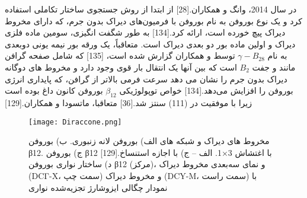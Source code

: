 در سال 2014، وانگ و همکاران.\cite{zhouSemimetallicTwoDimensionalBoron2014}[28] از ابتدا از روش جستجوی ساختار تکاملی استفاده کرد و یک نوع بوروفن به نام  بوروفن با فرمیون‌های دیراک بدون جرم، که دارای مخروط دیراک پیچ خورده است، ارائه کرد.[134] به طور شگفت انگیزی،  سومین ماده فلزی دیراک و اولین ماده بور دو بعدی دیراک است. متعاقباً، یک ورقه بور نیمه یونی دوبعدی به نام $\gamma-B_28$ توسط  و همکاران گزارش شده است، \cite{maGraphenelikeTwoDimensionalIonic2016}[135] که شامل صفحه گرافن مانند و جفت $B_2$ است که بین آنها یک انتقال بار قوی وجود دارد و مخروط های دوگانه دیراک بدون جرم را نشان می دهد سرعت فرمی بالاتر از گرافن، که پایداری انرژی بوروفن  را افزایش می‌دهد.[134] خواص توپولوژیکی $\beta_{12}$ بوروفن کانون داغ بوده است زیرا با موفقیت در  (111) سنتز شد.\cite{mannixSynthesisBorophenesAnisotropic2015}[36] متعاقبا، ماتسودا و همکاران.\cite{fengDiracFermionsBorophene2017}[129] 
\begin{figure*}
    \centering
    \texttt{[image: Diraccone.png]}
    \caption{مخروط های دیراک و شبکه های الف) بوروفن لانه زنبوری. ب) بوروفن β12. ج) بوروفن β12 با اغتشاش 3×1. الف – ج) با اجازه استنساخ.[129] د) ساختار نواری بوروفن β12 (مرکز)، و نمای سه‌بعدی مخروط دیراک (DCΓ-X، سمت چپ) و مخروط دیراک (DCY-M، سمت راست) با نمودار چگالی ایزوشارژ تجزیه‌شده نواری}
    \label{fig:Diraccone}
\end{figure*}
